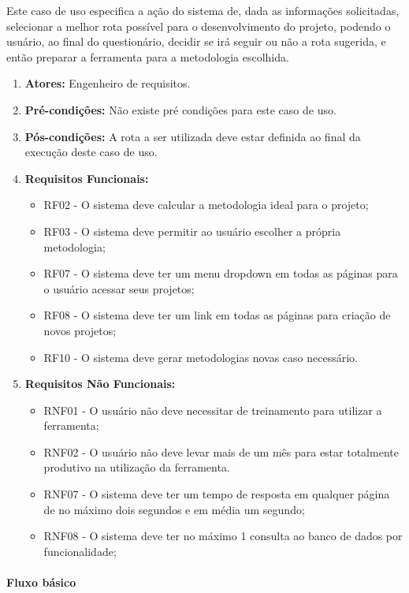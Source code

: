 Este caso de uso especifica a ação do sistema de, dada as informações solicitadas, selecionar a melhor rota possível para o desenvolvimento do projeto, podendo o usuário, ao final do questionário, decidir se irá seguir ou não a rota sugerida, e então preparar a ferramenta para a metodologia escolhida.

\begin{enumerate}
	\item \textbf{Atores:}
		Engenheiro de requisitos. 
	\item \textbf{Pré-condições:}
		Não existe pré condições para este caso de uso.
	\item \textbf{Pós-condições:}
		A rota a ser utilizada deve estar definida ao final da execução deste caso de uso.
	\item \textbf{Requisitos Funcionais:}
		\begin{itemize}
			\item RF02 - O sistema deve calcular a metodologia ideal para o projeto;
			\item RF03 - O sistema deve permitir ao usuário escolher a própria metodologia;
			\item RF07 - O sistema deve ter um menu dropdown em todas as páginas para o usuário acessar seus projetos;
			\item RF08 - O sistema deve ter um link em todas as páginas para criação de novos projetos;
			\item RF10 - O sistema deve gerar metodologias novas caso necessário.
		\end{itemize}
	\item \textbf{Requisitos Não Funcionais:}
		\begin{itemize}
			\item RNF01 - O usuário não deve necessitar de treinamento para utilizar a ferramenta;
			\item RNF02 - O usuário não deve levar mais de um mês para estar totalmente produtivo na utilização da ferramenta.
			\item RNF07 - O sistema deve ter um tempo de resposta em qualquer página de no máximo dois segundos e em média um segundo;
			\item RNF08 - O sistema deve ter no máximo 1 consulta ao banco de dados por funcionalidade;
		\end{itemize}
\end{enumerate}

\paragraph{Fluxo básico}

